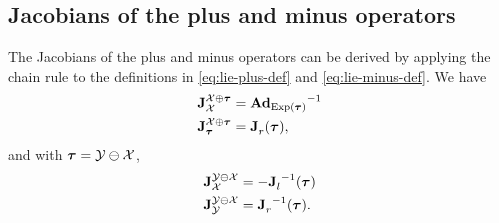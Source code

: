 \subsection{Jacobians of the plus and minus operators}
The Jacobians of the plus and minus operators can be derived by applying the chain rule to the definitions in \eqref{eq:lie-plus-def} and \eqref{eq:lie-minus-def}.
We have
\begin{align}
  \jac{\cX \oplus \vectau}{\cX} &= {\mAd_{\Exp(\vectau)}}^{-1}\\
  \jac{\cX \oplus \vectau}{\vectau} &= \jac{}{r}(\vectau),
\end{align}
and with $\vectau = \cY \ominus \cX$,
\begin{align}
  \jac{\cY \ominus \cX}{\cX} &= -\jac{}{l}^{-1}(\vectau)\\
  \jac{\cY \ominus \cX}{\cY} &= \jac{}{r}^{-1}(\vectau).
\end{align}


